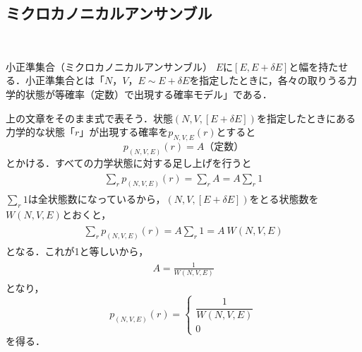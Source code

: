 \subsection{ミクロカノニカルアンサンブル}
　\begin{itembox}[l]{小正準集合（ミクロカノニカルアンサンブル）}
$E$に$[E,E+\delta E]$と幅を持たせる．小正準集合とは「$N$，$V$，$E\sim E+\delta E$を指定したときに，各々の取りうる力学的状態が等確率（定数）で出現する確率モデル」である．
\end{itembox}
上の文章をそのまま式で表そう．状態$(N,V,[E+\delta E])$を指定したときにある力学的な状態「$r$」が出現する確率を$p_{N,V,E}(r)$とすると
\begin{equation}
p_{(N,V,E)}(r)=A\mbox{（定数）}
\end{equation}
とかける．すべての力学状態に対する足し上げを行うと
  \begin{eqnarray*}
\begin{split}
\displaystyle\sum_{r}p_{(N,V,E)}(r)=\displaystyle\sum_{r}A=A\displaystyle\sum_{r}1
  \end{split}
\end{eqnarray*}
$\displaystyle\sum_{r}1$は全状態数になっているから，$(N,V,[E+\delta E])$をとる状態数を$W(N,V,E)$とおくと，
  \begin{eqnarray*}
\begin{split}
\displaystyle\sum_{r}p_{(N,V,E)}(r)=A\displaystyle\sum_{r}1=A\ W(N,V,E)
  \end{split}
\end{eqnarray*}
となる．これが1と等しいから，
  \begin{eqnarray*}
\begin{split}
A=\frac{1}{W(N,V,E)}
  \end{split}
\end{eqnarray*}
となり，
\begin{equation}
\label{p1}
p_{(N,V,E)}(r)=
{}
\begin{cases}
\dfrac{1}{W(N,V,E)}\\[20pt]
0
    \end{cases}
\end{equation}
を得る．


























